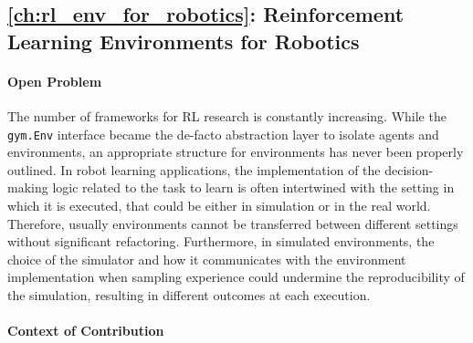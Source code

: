 \subsection{\autoref{ch:rl_env_for_robotics}: Reinforcement Learning Environments for Robotics}

\paragraph{Open Problem}

The number of frameworks for \ac{RL} research is constantly increasing.
While the \verb|gym.Env| interface became the de-facto abstraction layer to isolate agents and environments, an appropriate structure for environments has never been properly outlined.
In robot learning applications, the implementation of the decision-making logic related to the task to learn is often intertwined with the setting in which it is executed, that could be either in simulation or in the real world.
Therefore, usually environments cannot be transferred between different settings without significant refactoring.
Furthermore, in simulated environments, the choice of the simulator and how it communicates with the environment implementation when sampling experience could undermine the reproducibility of the simulation, resulting in different outcomes at each execution.

\paragraph{Context of Contribution}

